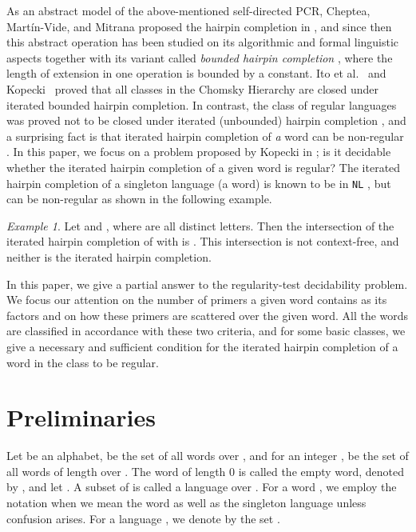 \documentclass{article}
\theoremstyle{plain}
\theoremstyle{remark}
\newtheorem{example}{Example}
\begin{document}
As an abstract model of the above-mentioned self-directed PCR, Cheptea, Mart\'{i}n-Vide, and Mitrana proposed the hairpin completion in \cite{ChMaMi06}, and since then this abstract operation has been studied on its algorithmic and formal linguistic aspects \cite{DiekertKopecki11, MaViMi09, MaMiYo09, MaMiYo10} together with its variant called {\it bounded hairpin completion} \cite{ItLeMaMi11, Kopecki10}, where the length of extension in one operation is bounded by a constant. 
Ito et al.~\cite{ItLeMaMi11} and Kopecki~\cite{Kopecki10} proved that all classes in the Chomsky Hierarchy are closed under iterated bounded hairpin completion. 
In contrast, the class of regular languages was proved not to be closed under iterated (unbounded) hairpin completion \cite{ChMaMi06}, and a surprising fact is that iterated hairpin completion of {\it a} word can be non-regular \cite{Kopecki10}. 
In this paper, we focus on a problem proposed by Kopecki in \cite{Kopecki10}; is it decidable whether the iterated hairpin completion of a given word is regular? 
The iterated hairpin completion of a singleton language (a word) is known to be in {\tt NL} \cite{ChMaMi06}, but can be non-regular as shown in the following example. 

\begin{example}\label{ex:nonx_cs}
	Let  and , where  are all distinct letters. 
	Then the intersection of the iterated hairpin completion of  with  is . 
	This intersection is not context-free, and neither is the iterated hairpin completion. 
\end{example}

In this paper, we give a partial answer to the regularity-test decidability problem. 
We focus our attention on the number of primers a given word contains as its factors and on how these primers are scattered over the given word. 
All the words are classified in accordance with these two criteria, and for some basic classes, we give a necessary and sufficient condition for the iterated hairpin completion of a word in the class to be regular. 


\section{Preliminaries}

Let  be an alphabet,  be the set of all words over , and for an integer ,  be the set of all words of length  over . 
The word of length 0 is called the empty word, denoted by , and let . 
A subset of  is called a language over . 
For a word , we employ the notation  when we mean the word as well as the singleton language  unless confusion arises. 
For a language , we denote by  the set . 
\end{document}

